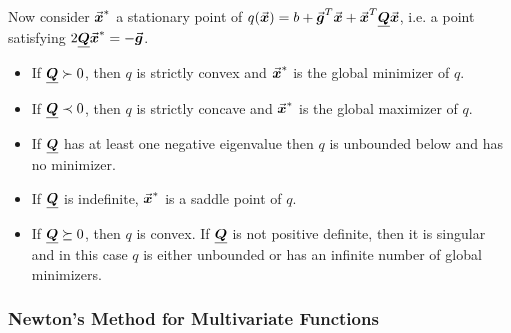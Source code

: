Now consider \(\vec{\boldsymbol{x}}^{*}\) a stationary point of \(q(\vec{\boldsymbol{x}}) = b + \vec{\boldsymbol{g}}^{T}\vec{\boldsymbol{x}} + \vec{\boldsymbol{x}}^{T}\underline{\boldsymbol{Q}}\vec{\boldsymbol{x}}\), i.e. a point satisfying \(2\underline{\boldsymbol{Q}}\vec{\boldsymbol{x}}^{*} = -\vec{\boldsymbol{g}}\).
\begin{itemize}
\item If \(\underline{\boldsymbol{Q}} \succ 0\), then \(q\) is strictly convex and \(\vec{\boldsymbol{x}}^{*}\) is the global minimizer of \(q\).
\item If \(\underline{\boldsymbol{Q}} \prec 0\), then \(q\) is strictly concave and \(\vec{\boldsymbol{x}}^{*}\) is the global maximizer of \(q\).
\item If \(\underline{\boldsymbol{Q}}\) has at least one negative eigenvalue then \(q\) is unbounded below and has no minimizer.
\item If \(\underline{\boldsymbol{Q}}\) is indefinite, \(\vec{\boldsymbol{x}}^{*}\) is a saddle point of \(q\).
\item If \(\underline{\boldsymbol{Q}} \succeq 0\), then \(q\) is convex. If \(\underline{\boldsymbol{Q}}\) is not positive definite, then it is singular and in this case \(q\) is either unbounded or has an infinite number of global minimizers.
\end{itemize}

\subsubsection{Newton's Method for Multivariate Functions}
\label{subsubsec:newton_multivariate}








